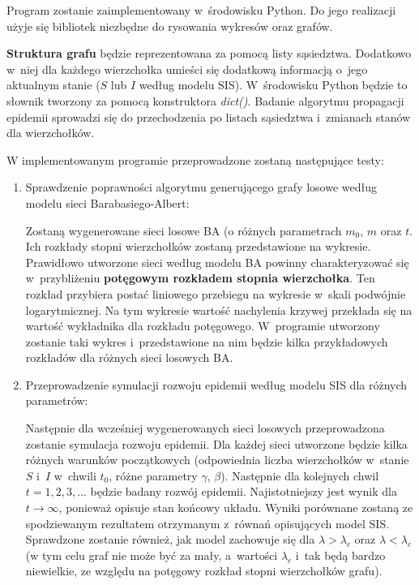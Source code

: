 Program zostanie zaimplementowany w~środowisku Python. Do jego realizacji użyje się bibliotek niezbędne do rysowania wykresów oraz grafów.

\textbf{Struktura grafu} będzie reprezentowana za pomocą listy sąsiedztwa. Dodatkowo w~niej dla każdego wierzchołka umieści się dodatkową informacją o~jego aktualnym stanie ($S$ lub $I$ według modelu SIS). W~środowisku Python będzie to słownik tworzony za pomocą konstruktora \textit{dict()}. Badanie algorytmu propagacji epidemii sprowadzi się do przechodzenia po listach sąsiedztwa i~zmianach stanów dla wierzchołków.

W implementowanym programie przeprowadzone zostaną następujące testy:
\begin{enumerate}
\item Sprawdzenie poprawności algorytmu generującego grafy losowe według modelu sieci Barabasiego-Albert:

Zostaną wygenerowane sieci losowe BA (o różnych parametrach $m_0$, $m$ oraz $t$. Ich rozkłady stopni wierzchołków zostaną przedstawione na wykresie. Prawidłowo utworzone sieci według modelu BA powinny charakteryzować się w~przybliżeniu \textbf{potęgowym rozkładem stopnia wierzchołka}. Ten rozkład przybiera postać liniowego przebiegu na wykresie w~skali podwójnie logarytmicznej. Na tym wykresie wartość nachylenia krzywej przekłada się na wartość wykładnika dla rozkładu potęgowego. W~programie utworzony zostanie taki wykres i~przedstawione na nim będzie kilka przykładowych rozkładów dla różnych sieci losowych BA.

\item Przeprowadzenie symulacji rozwoju epidemii według modelu SIS dla różnych parametrów:

Następnie dla wcześniej wygenerowanych sieci losowych przeprowadzona zostanie symulacja rozwoju epidemii. Dla każdej sieci utworzone będzie kilka różnych warunków początkowych (odpowiednia liczba wierzchołków w~stanie $S$ i~$I$ w~chwili $t_0$, różne parametry $\gamma$, $\beta$). Następnie dla kolejnych chwil $t = 1,2,3,...$ będzie badany rozwój epidemii. Najistotniejszy jest wynik dla $t\to\infty$, ponieważ opisuje stan końcowy układu. Wyniki porównane zostaną ze spodziewanym rezultatem otrzymanym z~równań opisujących model SIS. Sprawdzone zostanie również, jak model zachowuje się dla $\lambda > \lambda_c$ oraz $\lambda < \lambda_c$ (w tym celu graf nie może być za mały, a~wartości $\lambda_c$ i~tak będą bardzo niewielkie, ze względu na potęgowy rozkład stopni wierzchołków grafu). 


\end{enumerate}

\clearpage



